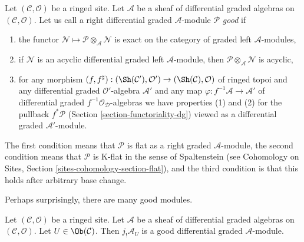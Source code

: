 \medskip\noindent
Let $(\mathcal{C}, \mathcal{O})$ be a ringed site.
Let $\mathcal{A}$ be a sheaf of differential graded algebras
on $(\mathcal{C}, \mathcal{O})$. Let us call a right differential
graded $\mathcal{A}$-module $\mathcal{P}$ {\it good}
if
\begin{enumerate}
\item the functor
$\mathcal{N} \mapsto \mathcal{P} \otimes_\mathcal{A} \mathcal{N}$
is exact on the category of graded left $\mathcal{A}$-modules,
\item if $\mathcal{N}$ is an acyclic differential graded left
$\mathcal{A}$-module, then
$\mathcal{P} \otimes_\mathcal{A} \mathcal{N}$ is acyclic,
\item for any morphism $(f, f^\sharp) : (\Sh(\mathcal{C}'), \mathcal{O}')
\to (\Sh(\mathcal{C}), \mathcal{O})$
of ringed topoi and any differential graded $\mathcal{O}'$-algebra
$\mathcal{A}'$ and any map $\varphi : f^{-1}\mathcal{A} \to \mathcal{A}'$
of differential graded $f^{-1}\mathcal{O}_\mathcal{D}$-algebras we have
properties (1) and (2) for the pullback $f^*\mathcal{P}$
(Section \ref{section-functoriality-dg})
viewed as a differential graded $\mathcal{A}'$-module.
\end{enumerate}
The first condition means that $\mathcal{P}$ is flat as a right graded
$\mathcal{A}$-module, the second condition means that $\mathcal{P}$ is
K-flat in the sense of Spaltenstein (see
Cohomology on Sites, Section \ref{sites-cohomology-section-flat}), and
the third condition is that this holds after arbitrary base change.

\medskip\noindent
Perhaps surprisingly, there are many good modules.

\begin{lemma}
\label{lemma-supply-good}
Let $(\mathcal{C}, \mathcal{O})$ be a ringed site.
Let $\mathcal{A}$ be a sheaf of differential graded algebras
on $(\mathcal{C}, \mathcal{O})$. Let $U \in \Ob(\mathcal{C})$.
Then $j_!\mathcal{A}_U$ is a good differential graded
$\mathcal{A}$-module.
\end{lemma}

